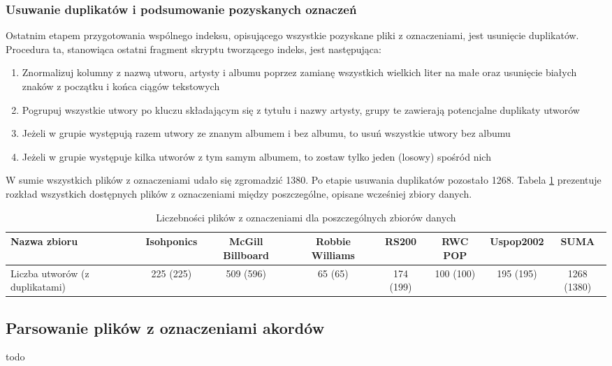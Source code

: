 \subsubsection{Usuwanie duplikatów i podsumowanie pozyskanych oznaczeń}

Ostatnim etapem przygotowania wspólnego indeksu, opisującego wszystkie pozyskane pliki z
oznaczeniami, jest usunięcie duplikatów. Procedura ta, stanowiąca ostatni fragment skryptu
tworzącego indeks, jest następująca:

\begin{enumerate}
    \item Znormalizuj kolumny z nazwą utworu, artysty i albumu poprzez zamianę wszystkich wielkich
        liter na małe oraz usunięcie białych znaków z początku i końca ciągów tekstowych
    \item Pogrupuj wszystkie utwory po kluczu składającym się z tytułu i nazwy artysty, grupy te
        zawierają potencjalne duplikaty utworów
    \item Jeżeli w grupie występują razem utwory ze znanym albumem i bez albumu, to usuń wszystkie
        utwory bez albumu
    \item Jeżeli w grupie występuje kilka utworów z tym samym albumem, to zostaw tylko jeden
        (losowy) spośród nich
\end{enumerate}

W sumie wszystkich plików z oznaczeniami udało się zgromadzić 1380. Po etapie usuwania duplikatów
pozostało 1268. Tabela \ref{tab:datasets1} prezentuje rozkład wszystkich dostępnych plików z
oznaczeniami między poszczególne, opisane wcześniej zbiory danych.

\begin{table}
    \caption{Liczebności plików z oznaczeniami dla poszczególnych zbiorów danych}
    \label{tab:datasets1}
    \begin{tabular}{|l|c|c|c|c|c|c|c|} \hline
        Nazwa zbioru & Isohponics & McGill Billboard & Robbie Williams & RS200 & RWC POP & Uspop2002 & SUMA \\ \hline
        Liczba utworów (z duplikatami) & 225 (225) & 509 (596) & 65 (65) & 174 (199) & 100 (100) & 195 (195) & 1268 (1380) \\ \hline
    \end{tabular}
\end{table}


\subsection{Parsowanie plików z oznaczeniami akordów}
todo


